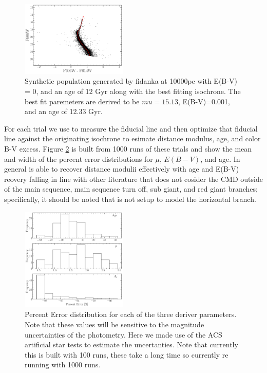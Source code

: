\begin{figure}
  \centering
  \includegraphics[width=0.45\textwidth]{ExtractedIsoFit.pdf}
  \caption{Synthetic population generated by fidanka at 10000pc with E(B-V) = 0, and an age of 12 Gyr along with the best fitting isochrone. The best fit paremeters are derived to be $mu=15.13$, E(B-V)=0.001, and an age of 12.33 Gyr.}
  \label{fig:ValidationBestFit}
\end{figure}

For each trial we use \fidanka to measure the fiducial line and then optimize that fiducial line against the originating isochrone to esimate distance modulus, age, and color B-V excess. Figure \ref{fig:validationDist} is built from 1000 runs of these trials and show the mean and width of the percent error distributions for $\mu$, $E(B-V)$, and age. In general \fidanka is able to recover distance modulii effectively with age and E(B-V) reovery falling in line with other literature that does not cosider the CMD outside of the main sequence, main sequence turn off, sub giant, and red giant branches; specifically, it should be noted that \fidanka is not setup to model the horizontal branch.

\begin{figure}
  \centering
  \includegraphics[width=0.45\textwidth]{DistributionOfErrors.pdf}
  \caption{Percent Error distribution for each of the three deriver parameters. Note that these values will be sensitive to the magnitude uncertainties of the photometry. Here we made use of the ACS artificial star tests to estimate the uncertanties. {\color{blue}Note that currently this is built with 100 runs, these take a long time so currently re running with 1000 runs.}}
  \label{fig:validationDist}
\end{figure}
